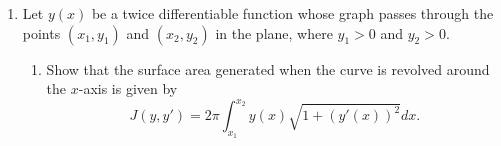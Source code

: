 \documentclass{article}
\begin{document}
\begin{enumerate}
\begin{proof}
\begin{align*}
                         & = 12x - \frac{d}{dx}2y' \\
                         & = 12x - 2y''.
                  \end{align*}
                  Therefore,
                  \begin{align*}
                        12x - 2y'' & = 0                 \\
                        y''        & = 6x                \\
                        y'         & = 3x^2 + c_1        \\
                        y          & = x^3 + xc_1 + c_2.
                  \end{align*}
                  We are left with the following system of equations:
                  \begin{align*}
                        0    & = (0)^3 + (0)c_1 + c_2 \\
                        1    & = (1)^3 + (1)c_1 + c_2 \\
                        \\
                        0    & = c_2                  \\
                        1    & = 1 + c_1 + c_2        \\
                        \\
                        c_1  & = 0                    \\
                        c_2  & = 0                    \\
                        \\
                        \therefore
                        y(x) & = x^3
                  \end{align*}
            \end{proof}
            \setcounter{enumi}{7}
      \item Let $y(x)$ be a twice differentiable function whose graph passes
            through the points $(x_1,y_1)$ and $(x_2,y_2)$ in the plane, where
            $y_1>0$ and $y_2>0$.
            \begin{enumerate}
                  \item Show that the surface area generated when the curve is
                        revolved around the $x$-axis is given by
                        \begin{equation}
                              J(y, y') = 2\pi\int_{x_1}^{x_2}y(x)
                              \sqrt{1+(y'(x))^2}dx.
                        \end{equation}

\end{enumerate}
\end{enumerate}
\end{document}
